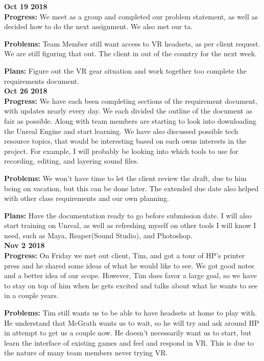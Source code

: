 \textbf{Oct 19 2018}\\
  \textbf{Progress:}
  We meet as a group and completed our problem statement, as well as decided how to do the next assignment. We also met our ta.

  \textbf{Problems:}
  Team Member still want access to VR headsets, as per client request. We are still figuring that out. The client in out of the country for the next week.

  \textbf{Plans:} 
  Figure out the VR gear situation and work together too complete the requirements document.\\

\textbf{Oct 26 2018}\\
\textbf{Progress:}
We have each been completing sections of the requirement document, with updates nearly every day. We each divided the outline of the document as fair as possible. Along with team members are starting to look into downloading the Unreal Engine and start learning. We have also discussed possible tech resource topics, that would be interesting based on each owns interests in the project. For example, I will probably be looking into which tools to use for recording, editing, and layering sound files.

\textbf{Problems:}
We won't have time to let the client review the draft, due to him being on vacation, but this can be done later. The extended due date also helped with other class requirements and our own planning.

\textbf{Plans:}
Have the documentation ready to go before submission date. I will also start training on Unreal, as well as refreshing myself on other tools I will know I need, such as Maya, Reaper(Sound Studio), and Photoshop.\\

\textbf{Nov 2 2018}\\
\textbf{Progress:}
On Friday we met out client, Tim, and got a tour of HP's printer press and he shared some ideas of what he would like to see. We got good notes and a better idea of our scope. However, Tim does favor a large goal, so we have to stay on top of him when he gets excited and talks about what he wants to see in a couple years.

\textbf{Problems:}
Tim still wants us to be able to have headsets at home to play with. He understand that McGrath wants us to wait, so he will try and ask around HP in attempt to get us a couple now. He doesn't necessarily want us to start, but learn the interface of existing games and feel and respond in VR. This is due to the nature of many team members never trying VR.

